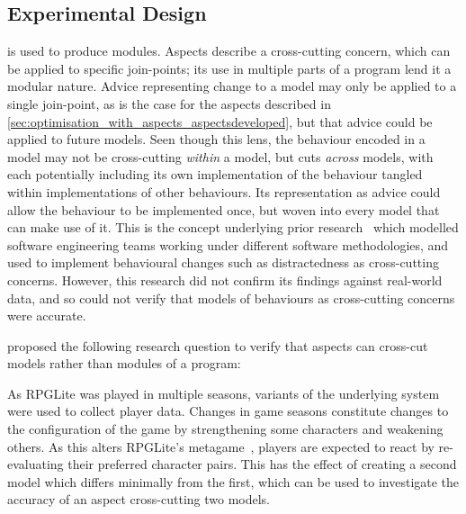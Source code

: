 \subsection{Experimental Design}


\Aop{} is used to produce modules. Aspects describe a cross-cutting concern,
which can be applied to specific join-points; its use in multiple parts of a
program lend it a modular nature. Advice representing change to a model may only
be applied to a single join-point, as is the case for the aspects described in
\cref{sec:optimisation_with_aspects_aspectsdeveloped}, but that advice could be
applied to future models. Seen though this lens, the behaviour encoded in a
model may not be cross-cutting \emph{within} a model, but cuts \emph{across}
models, with each potentially including its own implementation of the behaviour
tangled within implementations of other behaviours. Its representation as advice
could allow the behaviour to be implemented once, but woven into every model
that can make use of it. This is the concept underlying prior
research~\cite{wallis2018caise} which modelled software engineering teams
working under different software methodologies, and used \aop{} to implement
behavioural changes such as distractedness as cross-cutting concerns. However,
this research did not confirm its findings against real-world data, and so could
not verify that models of behaviours as cross-cutting concerns were accurate.

 proposed the following research question to verify that
aspects can cross-cut models rather than modules of a program:

\begin{researchquestion}
  \rqfour{}
\end{researchquestion}

As RPGLite was played in multiple seasons, variants of the underlying system
were used to collect player data. Changes in game seasons constitute changes to
the configuration of the game by strengthening some characters and weakening
others. As this alters RPGLite's metagame~\cite{kavanagh2021thesis}, players are
expected to react by re-evaluating their preferred character pairs. This has the
effect of creating a second model which differs minimally from the first, which
can be used to investigate the accuracy of an aspect cross-cutting two models.

